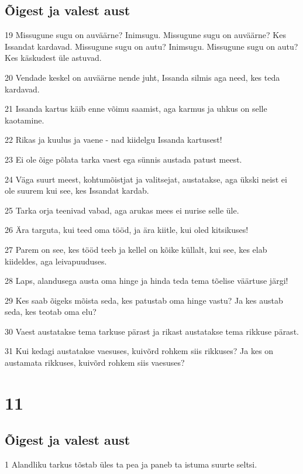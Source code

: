 \section*{Õigest ja valest aust}

\par 19 Missugune sugu on auväärne? Inimsugu. Missugune sugu on auväärne? Kes Issandat kardavad. Missugune sugu on autu? Inimsugu. Missugune sugu on autu? Kes käskudest üle astuvad.
\par 20 Vendade keskel on auväärne nende juht, Issanda silmis aga need, kes teda kardavad.
\par 21 Issanda kartus käib enne võimu saamist, aga karmus ja uhkus on selle kaotamine.
\par 22 Rikas ja kuulus ja vaene - nad kiidelgu Issanda kartusest!
\par 23 Ei ole õige põlata tarka vaest ega sünnis austada patust meest.
\par 24 Väga suurt meest, kohtumõistjat ja valitsejat, austatakse, aga ükski neist ei ole suurem kui see, kes Issandat kardab.
\par 25 Tarka orja teenivad vabad, aga arukas mees ei nurise selle üle.
\par 26 Ära targuta, kui teed oma tööd, ja ära kiitle, kui oled kitsikuses!
\par 27 Parem on see, kes tööd teeb ja kellel on kõike küllalt, kui see, kes elab kiideldes, aga leivapuuduses.
\par 28 Laps, alandusega austa oma hinge ja hinda teda tema tõelise väärtuse järgi!
\par 29 Kes saab õigeks mõista seda, kes patustab oma hinge vastu? Ja kes austab seda, kes teotab oma elu?
\par 30 Vaest austatakse tema tarkuse pärast ja rikast austatakse tema rikkuse pärast.
\par 31 Kui kedagi austatakse vaesuses, kuivõrd rohkem siis rikkuses? Ja kes on austamata rikkuses, kuivõrd rohkem siis vaesuses?

\chapter{11}

\section*{Õigest ja valest aust}

\par 1 Alandliku tarkus tõstab üles ta pea ja paneb ta istuma suurte seltsi.

